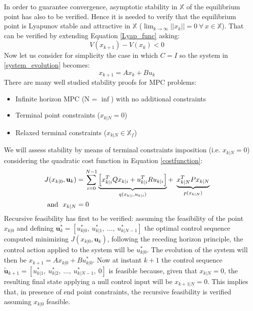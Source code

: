 In order to guarantee convergence, asymptotic stability in $\mathbb{X}$ of the equilibrium point has also to be verified. Hence it is needed to verify that the equilibrium point is Lyapunov stable and attractive in $\mathbb{X}$ ($\lim_{k \to \infty}||x_k||=0\ \forall\ x \in \mathbb{X}$). 
That can be verified by extending Equation \eqref{Lyap_func} asking: 
\begin{equation}
	V(x_{k+1})-V(x_{k}) < 0
\end{equation} 
Now let us consider for simplicity the case in which $C=I$ so the system in \eqref{system_evolution} becomes:
\begin{equation*}
x_{k+1}=Ax_k+Bu_k
\end{equation*}
There are many well studied stability proofs for MPC problems:
\begin{itemize}
	\item Infinite horizon MPC (N = $\inf$) with no additional constraints
	\item Terminal point constraints ($x_{k|N}=0$)
	\item Relaxed terminal constraints ($x_{k|N} \in \mathbb{X}_f $)
\end{itemize}
We will assess stability by means of terminal constraints imposition (i.e. $x_{k|N}=0$) considering the quadratic cost function in Equation \eqref{costfunction}:
\begin{equation}
\begin{split}
J(x_{k|0},\textbf{u}_k) &= \sum_{i=0}^{N-1} \underbrace{\left[x_{k|i}^T Q x_{k|i} + u_{k|i}^TRu_{k|i} \right]}_{q(x_{k|i},u_{k|i})} +\ \underbrace{x_{k|N}^T P x_{k|N}}_{p(x_{k|N})} \\
\textnormal{and}\ \  x_{k|N}&=0
\end{split}
\end{equation}
Recursive feasibility has first to be verified: assuming the feasibility of the point $x_{k|0}$ and defining $\textbf{u}_k^*=[u_{k|0}^*,\ u_{k|1}^*,\ \dots,\ u_{k|N-1}^*]$ the optimal control sequence computed minimizing $J(x_{k|0},\textbf{u}_k)$, following the receding horizon principle, the control action applied to the system will be $u_{k|0}^*$. The evolution of the system will then be $x_{k+1}=Ax_{k|0}+Bu_{k|0}^*$.
Now at instant $k+1$ the control sequence $\tilde{\textbf{u}}_{k+1}=[u_{k|1}^*,\ u_{k|2}^*,\ \dots,\ u_{k|N-1}^*,\ 0]$ is feasible because, given that $x_{k|N}=0$, the resulting final state applying a null control input will be $x_{k+1|N}=0$. This implies that, in presence of end point constraints, the recursive feasibility is verified assuming $x_{k|0}$ feasible.

